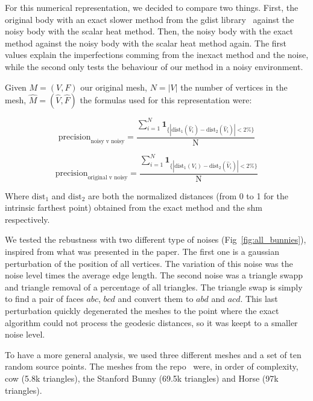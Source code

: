 \documentclass[sigconf]{acmart}
\begin{document}
For this numerical representation, we decided to compare two things. First, the original body
with an exact slower method from the gdist library~\cite{exact_method_algorithm}\cite{exact_method_library}
against the noisy body with the scalar heat method.
Then, the noisy body with the exact method against the noisy body with the scalar heat method again.
The first values explain the imperfections comming from the inexact method and the noise, while
the second only tests the behaviour of our method in a noisy environment.

Given $M = (V, F)$ our original mesh, $N = |V|$ the number of vertices in the mesh, $\hat{M} = (\hat{V}, \hat{F})$ the formulas used for this representation were:

\begin{equation} \label{eq:nvn_precision}
  \text{precision}_{\text{noisy v noisy}} = \frac{\sum_{i=1}^N \mathbf{1}_{\{|\text{dist}_1(\hat{V}_i) - \text{dist}_2(\hat{V}_i)| < 2\%\}}}{\text{N}} 
\end{equation}

\begin{equation} \label{eq:ovn_precision}
  \text{precision}_{\text{original v noisy}} = \frac{\sum_{i=1}^N \mathbf{1}_{\{|\text{dist}_1(V_i) - \text{dist}_2(\hat{V}_i)| < 2\%\}}}{\text{N}} 
\end{equation}

Where $\text{dist}_1$ and $\text{dist}_2$ are both the normalized distances (from 0 to 1 for the intrinsic farthest point) obtained from the exact method and the shm respectively.

We tested the rebustness with two different type of noises (Fig~\ref{fig:all_bunnies}), inspired from what was presented in the paper. 
The first one is a gaussian perturbation of the position of all vertices. The variation of this noise was the noise level times the average edge length.
The second noise was a triangle swapp and triangle removal of a percentage of all triangles.
The triangle swap is simply to find a pair of faces $abc$, $bcd$ and convert them to $abd$ and $acd$.
This last perturbation quickly degenerated the meshes to the point where the exact algorithm could not
process the geodesic distances, so it was keept to a smaller noise level. 

To have a more general analysis, we used three different meshes and a set of ten random
source points. The meshes from the repo~\cite{github_objects_repo} were, in order of complexity, cow (5.8k triangles), the Stanford Bunny (69.5k triangles) and Horse (97k triangles).
\end{document}
